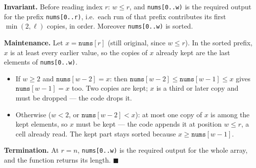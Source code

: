 \begin{invariantbox}
\textbf{Invariant.} Before reading index $r$: $w \le r$, and \texttt{nums[0..w)} is the required output for the prefix \texttt{nums[0..r)}, i.e.\ each run of that prefix contributes its first $\min(2, \ell)$ copies, in order. Moreover \texttt{nums[0..w)} is sorted.

\textbf{Maintenance.} Let $x = \texttt{nums}[r]$ (still original, since $w \le r$). In the sorted prefix, $x$ is at least every earlier value, so the copies of $x$ already kept are the last elements of \texttt{nums[0..w)}.
\begin{itemize}[leftmargin=*]
    \item If $w \ge 2$ and $\texttt{nums}[w-2] = x$: then $\texttt{nums}[w-2] \le \texttt{nums}[w-1] \le x$ gives $\texttt{nums}[w-1] = x$ too. Two copies are kept; $x$ is a third or later copy and must be dropped --- the code drops it.
    \item Otherwise ($w < 2$, or $\texttt{nums}[w-2] < x$): at most one copy of $x$ is among the kept elements, so $x$ must be kept --- the code appends it at position $w \le r$, a cell already read. The kept part stays sorted because $x \ge \texttt{nums}[w-1]$.
\end{itemize}
\textbf{Termination.} At $r = n$, \texttt{nums[0..w)} is the required output for the whole array, and the function returns its length. \hfill$\blacksquare$
\end{invariantbox}

